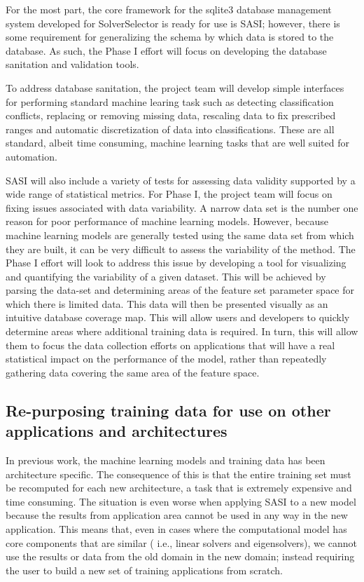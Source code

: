 For the most part, the core framework for the sqlite3 database management system developed for SolverSelector is ready for use is SASI; however, there is some requirement for generalizing the schema by which data is stored to the database. As such, the Phase I effort will focus on developing the database sanitation and validation tools. 

To address database sanitation, the project team will develop simple interfaces for performing standard machine learing task such as detecting classification conflicts, replacing or removing missing data, rescaling data to fix prescribed ranges and automatic discretization of data into classifications. These are all standard, albeit time consuming, machine learning tasks that are well suited for automation. 

SASI will also include a variety of tests for assessing data validity supported by a wide range of statistical metrics. For Phase I, the project team will focus on fixing issues associated with data variability. A narrow data set is the number one reason for poor performance of machine learning models. However, because machine learning models are generally tested using the same data set from which they are built, it can be very difficult to assess the variability of the method. The Phase I effort will look to address this issue by developing a tool for visualizing and quantifying the variability of a given dataset. This will be achieved by parsing the data-set and determining areas of the feature set parameter space for which there is limited data. This data will then be presented visually as an intuitive database coverage map. This will allow users and developers to quickly determine areas where additional training data is required. In turn, this will allow them to focus the data collection efforts on applications that will have a real statistical impact on the performance of the model, rather than repeatedly gathering data covering the same area of the feature space. 


\subsection{ Re-purposing training data for use on other applications and architectures }
\label{sec:reuse}
In previous work, the machine learning models and training data has been architecture specific. The consequence of this is that the entire training set must be recomputed for each new architecture, a task that is extremely expensive and time consuming. The situation is even worse when applying SASI to a new model because the results from application area cannot be used in any way in the new application. This means that, even in cases where the computational model has core components that are similar ( i.e., linear solvers and eigensolvers), we cannot use the results or data from the old domain in the new domain; instead requiring the user to build a new set of training applications from scratch.  

